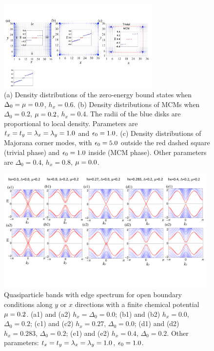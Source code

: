 \documentclass[twocolumn,prl,floatfix,citeautoscript,nofootinbib,superscriptaddress]{revtex4}
\begin{document}
\begin{figure}[t]
\centering\includegraphics[width=0.72\textwidth]{FigS1.pdf}
\caption{(a) Density distributions of the zero-energy bound states when $%
\Delta _{0}=\protect\mu =0.0$, $h_{x}=0.6$. (b) Density distributions of
MCMs when $\Delta _{0}=0.2$, $\protect\mu =0.2$, $h_{x}=0.4$. The radii of
the blue disks are proportional to local density. Parameters are $%
t_{x}=t_{y}=\protect\lambda _{x}=\protect\lambda _{y}=1.0$ and $\protect%
\epsilon _{0}=1.0$. (c) Density distributions of Majorana corner modes, with
$\protect\epsilon _{0}=5.0$ outside the red dashed square (trivial phase)
and $\protect\epsilon _{0}=1.0$ inside (MCM phase). Other parameters are $%
\Delta _{0}=0.4$, $h_{x}=0.8$, $\protect\mu =0.0$.}
\label{FigS1}
\end{figure}
\begin{figure}[t]
\centering\includegraphics[width=0.98\textwidth]{FigS2.pdf}
\caption{Quasiparticle bands with edge spectrum for open boundary conditions
along $y$ or $x$ directions with a finite chemical potential $\protect\mu %
=0.2$. (a1) and (a2) $h_{x}=\Delta _{0}=0.0$; (b1) and (b2) $h_{x}=0.0$, $%
\Delta _{0}=0.2$; (c1) and (c2) $h_{x}=0.27$, $\Delta _{0}=0.0$; (d1) and
(d2) $h_{x}=0.283$, $\Delta _{0}=0.2$; (e1) and (e2) $h_{x}=0.4$, $\Delta
_{0}=0.2$. Other parameters: $t_{x}=t_{y}=\protect\lambda _{x}=\protect%
\lambda _{y}=1.0$, $\protect\epsilon _{0}=1.0$.}
\label{FigS2}
\end{figure}
\end{document}
